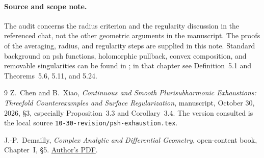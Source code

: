 \documentclass[11pt]{amsart}
\theoremstyle{definition}
\theoremstyle{remark}
\numberwithin{equation}{section}
\begin{document}
\paragraph{Source and scope note.}
The audit concerns the radius criterion and the regularity discussion
in the referenced chat, not the other geometric arguments in the
manuscript. The proofs of the averaging, radius, and regularity steps
are supplied in this note. Standard background on psh functions,
holomorphic pullback, convex composition, and removable singularities
can be found in \cite[Chapter~I, \S5]{Demailly}; in that chapter see
Definition~5.1 and Theorems~5.6, 5.11, and 5.24.

\begin{thebibliography}{9}
Z.~Chen and B.~Xiao,
\emph{Continuous and Smooth Plurisubharmonic Exhaustions:
Threefold Counterexamples and Surface Regularization},
manuscript, October 30, 2026, \S3, especially Proposition~3.3 and
Corollary~3.4. The version consulted is the local source
\texttt{10-30-revision/psh-exhaustion.tex}.

J.-P.~Demailly,
\emph{Complex Analytic and Differential Geometry},
open-content book, Chapter~I, \S5.
\href{https://www-fourier.univ-grenoble-alpes.fr/~demailly/manuscripts/agbook.pdf}
{Author's PDF}.
\end{thebibliography}
\end{document}
